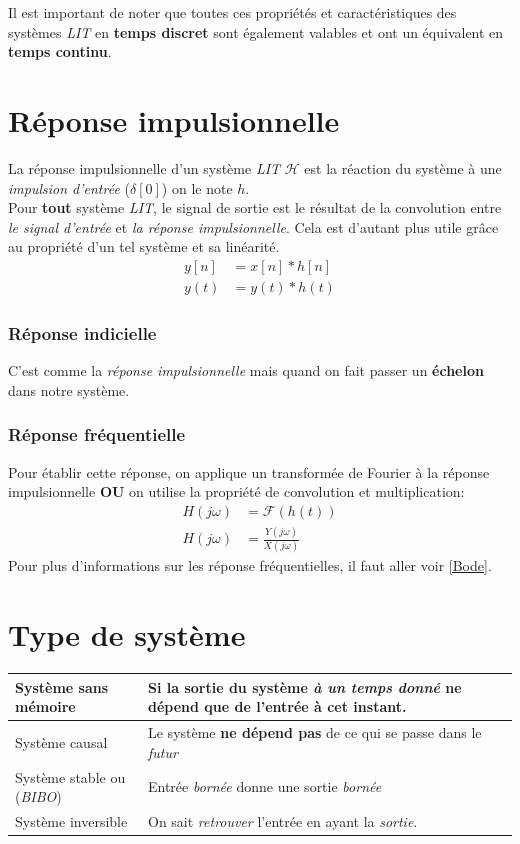 \documentclass{report}
\begin{document}
Il est important de noter que toutes ces propriétés et caractéristiques des systèmes \textit{LIT} en \textbf{temps discret} sont également valables et ont un équivalent en \textbf{temps continu}.


\section{Réponse impulsionnelle}
La réponse impulsionnelle d'un système \textit{LIT} $\mathcal{H}$ est la réaction du système à une \textit{impulsion d'entrée} ($\delta[0]$) on le note $h$.\\

Pour \textbf{tout} système \textit{LIT}, le signal de sortie est le résultat de la convolution entre \textit{le signal d'entrée} et \textit{la réponse impulsionnelle}. Cela est d'autant plus utile grâce au propriété d'un tel système et sa linéarité.
\begin{align}
y[n] &= x[n] \ast h[n]\\
y(t) &= y(t) \ast h(t)
\end{align}

\subsubsection{Réponse indicielle}
C'est comme la \textit{réponse impulsionnelle} mais quand on fait passer un \textbf{échelon} dans notre système.

\subsubsection{Réponse fréquentielle}
Pour établir cette réponse, on applique un transformée de Fourier à la réponse impulsionnelle \textbf{OU} on utilise la propriété de convolution et multiplication:
\begin{align*}
H(j \omega) &= \mathcal{F}(h(t))\\
H(j \omega) &= \frac{Y(j \omega)}{X(j \omega)}
\end{align*}
Pour plus d'informations sur les réponse fréquentielles, il faut aller voir \ref{Bode}.

\section{Type de système}
\begin{center}
\begin{tabular}{|m{4cm}|m{10cm}|}
	\hline
	Système sans mémoire & Si la sortie du système \textit{à un temps donné} ne dépend que de l'entrée à \textbf{cet instant}.\\
	\hline
	Système causal & Le système \textbf{ne dépend pas} de ce qui se passe dans le \textit{futur}\\
	\hline
	Système stable ou (\textit{BIBO}) & Entrée \textit{bornée} donne une sortie \textit{bornée}\\
	\hline
	Système inversible & On sait \textit{retrouver} l'entrée en ayant la \textit{sortie}.\\
	\hline

\end{tabular}
\end{center}
\end{document}

